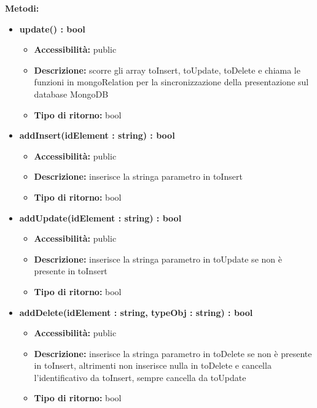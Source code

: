 {{		\textbf{Metodi:}
			\begin{itemize}
			\item \textbf{update() : bool}
				\begin{itemize}
				\item \textbf{Accessibilit\`{a}:} public
				\item \textbf{Descrizione:} scorre gli array toInsert, toUpdate, toDelete e chiama le funzioni in mongoRelation per la sincronizzazione della presentazione sul database MongoDB
				\item \textbf{Tipo di ritorno:} bool
				\end{itemize}
			\item \textbf{addInsert(idElement : string) : bool}
				\begin{itemize}
				\item \textbf{Accessibilit\`{a}:} public
				\item \textbf{Descrizione:} inserisce la stringa parametro in toInsert
				\item \textbf{Tipo di ritorno:} bool
				\end{itemize}
			\item \textbf{addUpdate(idElement : string) : bool}
				\begin{itemize}
				\item \textbf{Accessibilit\`{a}:} public
				\item \textbf{Descrizione:} inserisce la stringa parametro in toUpdate se non \`{e} presente in toInsert
				\item \textbf{Tipo di ritorno:} bool
				\end{itemize}
			\item \textbf{addDelete(idElement : string, typeObj : string) : bool}
				\begin{itemize}
				\item \textbf{Accessibilit\`{a}:} public
				\item \textbf{Descrizione:} inserisce la stringa parametro in toDelete se non \`{e} presente in toInsert, altrimenti non inserisce nulla in toDelete e cancella l'identificativo da toInsert, sempre cancella da toUpdate
				\item \textbf{Tipo di ritorno:} bool
				\end{itemize}


			\end{itemize}
	}
 }
	
	
	
	
	
	
	
	
	
	